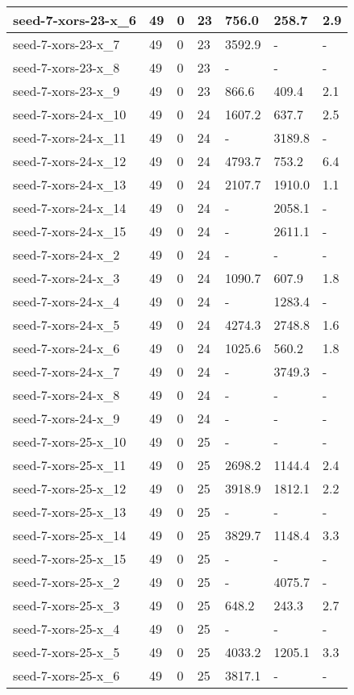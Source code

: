 \begin{scriptsize}
\begin{longtable}{|p{5cm}|l|l|l|l|l|l|}
seed-7-xors-23-x\_6&49&0&23&756.0&258.7&2.9 \\ \hline 
seed-7-xors-23-x\_7&49&0&23&3592.9&-&- \\ \hline 
seed-7-xors-23-x\_8&49&0&23&-&-&- \\ \hline 
seed-7-xors-23-x\_9&49&0&23&866.6&409.4&2.1 \\ \hline 
seed-7-xors-24-x\_10&49&0&24&1607.2&637.7&2.5 \\ \hline 
seed-7-xors-24-x\_11&49&0&24&-&3189.8&- \\ \hline 
seed-7-xors-24-x\_12&49&0&24&4793.7&753.2&6.4 \\ \hline 
seed-7-xors-24-x\_13&49&0&24&2107.7&1910.0&1.1 \\ \hline 
seed-7-xors-24-x\_14&49&0&24&-&2058.1&- \\ \hline 
seed-7-xors-24-x\_15&49&0&24&-&2611.1&- \\ \hline 
seed-7-xors-24-x\_2&49&0&24&-&-&- \\ \hline 
seed-7-xors-24-x\_3&49&0&24&1090.7&607.9&1.8 \\ \hline 
seed-7-xors-24-x\_4&49&0&24&-&1283.4&- \\ \hline 
seed-7-xors-24-x\_5&49&0&24&4274.3&2748.8&1.6 \\ \hline 
seed-7-xors-24-x\_6&49&0&24&1025.6&560.2&1.8 \\ \hline 
seed-7-xors-24-x\_7&49&0&24&-&3749.3&- \\ \hline 
seed-7-xors-24-x\_8&49&0&24&-&-&- \\ \hline 
seed-7-xors-24-x\_9&49&0&24&-&-&- \\ \hline 
seed-7-xors-25-x\_10&49&0&25&-&-&- \\ \hline 
seed-7-xors-25-x\_11&49&0&25&2698.2&1144.4&2.4 \\ \hline 
seed-7-xors-25-x\_12&49&0&25&3918.9&1812.1&2.2 \\ \hline 
seed-7-xors-25-x\_13&49&0&25&-&-&- \\ \hline 
seed-7-xors-25-x\_14&49&0&25&3829.7&1148.4&3.3 \\ \hline 
seed-7-xors-25-x\_15&49&0&25&-&-&- \\ \hline 
seed-7-xors-25-x\_2&49&0&25&-&4075.7&- \\ \hline 
seed-7-xors-25-x\_3&49&0&25&648.2&243.3&2.7 \\ \hline 
seed-7-xors-25-x\_4&49&0&25&-&-&- \\ \hline 
seed-7-xors-25-x\_5&49&0&25&4033.2&1205.1&3.3 \\ \hline 
seed-7-xors-25-x\_6&49&0&25&3817.1&-&- \\ \hline 

\end{longtable}
\end{scriptsize}
